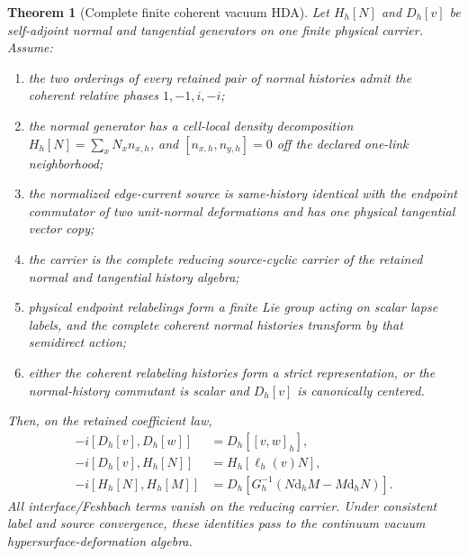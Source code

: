 \documentclass[11pt]{article}
\newtheorem{theorem}{Theorem}[section]
\theoremstyle{definition}
\theoremstyle{remark}
\newcommand{\dd}{\mathrm d}
\begin{document}
\begin{theorem}[Complete finite coherent vacuum HDA]
\label{thm:master-vacuum-HDA-v036}
Let \(H_h[N]\) and \(D_h[v]\) be self-adjoint normal and tangential generators
on one finite physical carrier.  Assume:
\begin{enumerate}[label=\textup{(H\arabic*)},leftmargin=3em]
\item the two orderings of every retained pair of normal histories admit the
      coherent relative phases \(1,-1,i,-i\);
\item the normal generator has a cell-local density decomposition
      \(H_h[N]=\sum_xN_xn_{x,h}\), and
      \([n_{x,h},n_{y,h}]=0\) off the declared one-link neighborhood;
\item the normalized edge-current source is same-history identical with the
      endpoint commutator of two unit-normal deformations and has one physical
      tangential vector copy;
\item the carrier is the complete reducing source-cyclic carrier of the
      retained normal and tangential history algebra;
\item physical endpoint relabelings form a finite Lie group acting on scalar
      lapse labels, and the complete coherent normal histories transform by
      that semidirect action;
\item either the coherent relabeling histories form a strict representation,
      or the normal-history commutant is scalar and \(D_h[v]\) is canonically
      centered.
\end{enumerate}
Then, on the retained coefficient law,
\begin{align}
 -i[D_h[v],D_h[w]]
 &=D_h[[v,w]_h],
 \label{eq:master-V036-DD}\\
 -i[D_h[v],H_h[N]]
 &=H_h[\ell_h(v)N],
 \label{eq:master-V036-DN}\\
 -i[H_h[N],H_h[M]]
 &=D_h\!\left[G_h^{-1}(N\dd_hM-M\dd_hN)\right].
 \label{eq:master-V036-NN}
\end{align}
All interface/Feshbach terms vanish on the reducing carrier.  Under consistent
label and source convergence, these identities pass to the continuum vacuum
hypersurface-deformation algebra.
\end{theorem}
\end{document}
